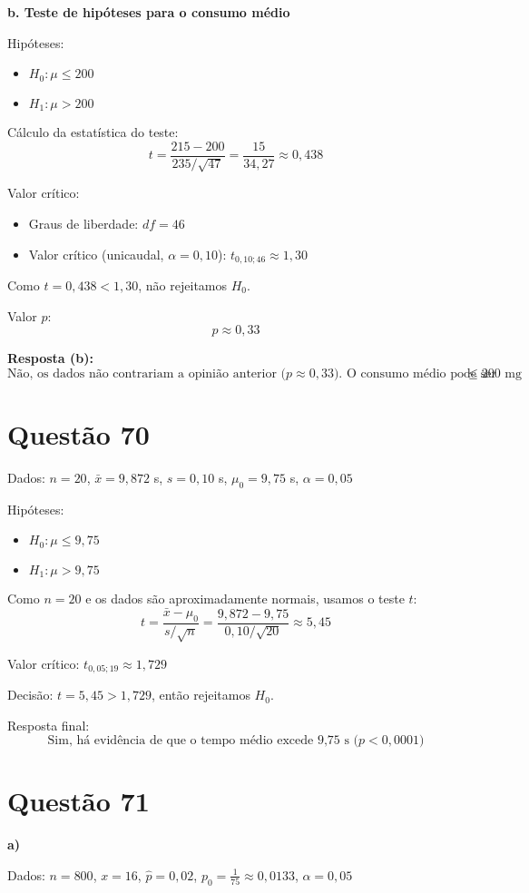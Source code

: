 \documentclass[12pt]{article}
\newcommand{\quest}[1]{\section*{Questão #1}} %
\begin{document}
\textbf{b. Teste de hipóteses para o consumo médio}

Hipóteses:
\begin{itemize}
  \item $H_0: \mu \leq 200$
  \item $H_1: \mu > 200$
\end{itemize}

Cálculo da estatística do teste:
\[
t = \frac{215 - 200}{235 / \sqrt{47}} = \frac{15}{34{,}27} \approx 0{,}438
\]

Valor crítico:
\begin{itemize}
  \item Graus de liberdade: $df = 46$
  \item Valor crítico (unicaudal, $\alpha = 0{,}10$): $t_{0{,}10; 46} \approx 1{,}30$
\end{itemize}

Como $t = 0{,}438 < 1{,}30$, não rejeitamos $H_0$.

Valor $p$:
\[
p \approx 0{,}33
\]

\textbf{Resposta (b):}
\[
\boxed{\text{Não, os dados não contrariam a opinião anterior ($p \approx 0{,}33$). O consumo médio pode ser } \leq 200 \text{ mg}}
\]





\quest{70}

Dados: $n = 20$, $\bar{x} = 9{,}872$ s, $s = 0{,}10$ s, $\mu_0 = 9{,}75$ s, $\alpha = 0{,}05$

Hip\'oteses:
\begin{itemize}
  \item $H_0: \mu \leq 9{,}75$
  \item $H_1: \mu > 9{,}75$
\end{itemize}

Como $n = 20$ e os dados s\~ao aproximadamente normais, usamos o teste $t$:
\[
t = \frac{\bar{x} - \mu_0}{s / \sqrt{n}} = \frac{9{,}872 - 9{,}75}{0{,}10 / \sqrt{20}} \approx 5{,}45
\]

Valor cr\'itico: $t_{0{,}05; 19} \approx 1{,}729$

Decis\~ao: $t = 5{,}45 > 1{,}729$, ent\~ao rejeitamos $H_0$.

Resposta final:
\[
\boxed{\text{Sim, h\'a evid\^encia de que o tempo m\'edio excede 9{,}75 s ($p < 0{,}0001$)}}
\] 

\quest{71}

\textbf{a)}

Dados: $n = 800$, $x = 16$, $\hat{p} = 0{,}02$, $p_0 = \frac{1}{75} \approx 0{,}0133$, $\alpha = 0{,}05$
\end{document}
